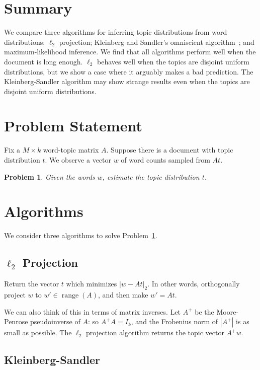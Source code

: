 \documentclass{article}
\DeclareMathOperator{\Range}{range}
\newtheorem{Problem}{Problem}
\begin{document}
\section{Summary}

We compare three algorithms for inferring topic distributions from word distributions:
    \(\ell_2\) projection; Kleinberg and Sandler's omniscient algorithm~\cite{kleinberg2004using}; and maximum-likelihood inference.
We find that all algorithms perform well when the document is long enough.
\(\ell_2\) behaves well when the topics are disjoint uniform distributions, but we show a case where it arguably makes a bad prediction.
The Kleinberg-Sandler algorithm may show strange results even when the topics are disjoint uniform distributions.

\section{Problem Statement}

Fix a \(M \times k\) word-topic matrix \(A\).
Suppose there is a document with topic distribution \(t\).
We observe a vector \(w\) of word counts sampled from \(At\).
\begin{Problem}
    \label{Problem:InferTopics}
    Given the words \(w\), estimate the topic distribution \(t\).
\end{Problem}

\section{Algorithms}

We consider three algorithms to solve Problem~\ref{Problem:InferTopics}.

\subsection{\(\ell_2\) Projection}

Return the vector \(t\) which minimizes \(|w - A t|_2\).
In other words, orthogonally project \(w\) to \(w' \in \Range(A)\), and then make \(w' = A t\).

We can also think of this in terms of matrix inverses.
Let \(A^+\) be the Moore-Penrose pseudoinverse of \(A\): so \(A^+A = I_k\), and the Frobenius norm of \(|A^+|\) is as small as possible.
The \(\ell_2\) projection algorithm returns the topic vector \(A^+w\).

\subsection{Kleinberg-Sandler}
\end{document}
